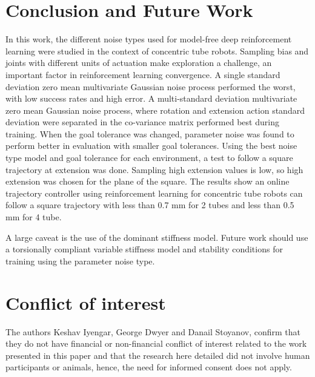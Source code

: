 \section{Conclusion and Future Work}
In this work, the different noise types used for model-free deep reinforcement learning were studied in the context of concentric tube robots. Sampling bias and joints with different units of actuation make exploration a challenge, an important factor in reinforcement learning convergence. A single standard deviation zero mean multivariate Gaussian noise process performed the worst, with low success rates and high error. A multi-standard deviation multivariate zero mean Gaussian noise process, where rotation and extension action standard deviation were separated in the co-variance matrix performed best during training. When the goal tolerance was changed, parameter noise was found to perform better in evaluation with smaller goal tolerances. Using the best noise type model and goal tolerance for each environment, a test to follow a square trajectory at extension was done. Sampling high extension values is low, so high extension was chosen for the plane of the square. The results show an online trajectory controller using reinforcement learning for concentric tube robots can follow a square trajectory with less than 0.7 mm for 2 tubes and less than 0.5 mm for 4 tube.

A large caveat is the use of the dominant stiffness model. Future work should use a torsionally compliant variable stiffness model and stability conditions for training using the parameter noise type. 


%
\section*{Conflict of interest}
The authors Keshav Iyengar, George Dwyer and Danail Stoyanov, confirm that they do not have financial or non-financial conflict of interest related to the work presented in this paper and that the research here detailed did not involve human participants or animals, hence, the need for informed consent does not apply.
%


